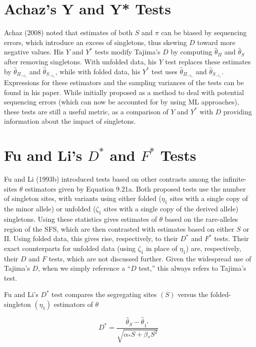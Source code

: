 \documentclass{article}
\begin{document}
\section{Achaz's Y and Y* Tests}
Achaz (2008) noted that estimates of both $S$ and $\pi$ can be biased by sequencing errors, which introduce an excess of singletons, thus skewing $D$ toward more negative values. His $Y$ and $Y^{*}$ tests modify Tajima's $D$ by computing $\widehat{\theta}_{\Pi}$ and $\widehat{\theta}_{S}$ after removing singletons. With unfolded data, his $Y$ test replaces these estimates by $\widehat{\theta}_{\Pi_{-c_1}}$ and $\widehat{\theta}_{S_{-c_1}}$, while with folded data, his $Y^{*}$ test uses $\widehat{\theta}_{\Pi_{-c_1}}$ and $\widehat{\theta}_{S_{-c_1}}$. Expressions for these estimators and the sampling variances of the tests can be found in his paper. While initially proposed as a method to deal with potential sequencing errors (which can now be accounted for by using ML approaches), these tests are still a useful metric, as a comparison of $Y$ and $Y^{*}$ with $D$ providing information about the impact of singletons.

\section{Fu and Li's  $ D^{*} $ and  $ F^{*} $ Tests}
Fu and Li (1993b) introduced tests based on other contrasts among the infinite-sites $\theta$ estimators given by Equation 9.21a. Both proposed tests use the number of singleton sites, with variants using either folded ($\eta_{1}$ sites with a single copy of the minor allele) or unfolded ($\zeta_{1}$ sites with a single copy of the derived allele) singletons. Using these statistics gives estimates of $\theta$ based on the rare-alleles region of the SFS, which are then contrasted with estimates based on either $S$ or II. Using folded data, this gives rise, respectively, to their $D^{*}$ and $F^{*}$ tests. Their exact counterparts for unfolded data (using $\zeta_{1}$ in place of $\eta_{1}$) are, respectively, their $D$ and $F$ tests, which are not discussed further. Given the widespread use of Tajima's $D$, when we simply reference a “$D$ test,” this always refers to Tajima’s test.

Fu and Li's $D^{*}$ test compares the segregating sites $(S)$ versus the folded-singleton $(\eta_{1})$ estimators of $\theta$

\begin{equation}
D^{*}=\frac{\widehat{\theta}_{S}-\widehat{\theta}_{1^{*}}}{\sqrt{\alpha_{*}S+\beta_{*}S^{2}}}
\tag{9.20a}
\label{eq:9_20a}
\end{equation}
\end{document}
